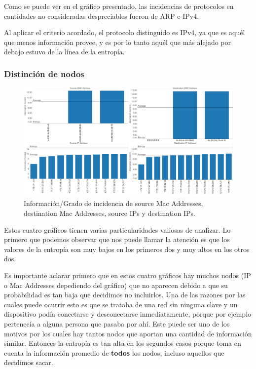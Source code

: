 \documentclass{article}
\theoremstyle{definition}
\theoremstyle{remark}
\begin{document}
Como se puede ver en el gráfico presentado, las incidencias de protocolos en cantidades no consideradas despreciables fueron de ARP e IPv4. 

Al aplicar el criterio acordado, el protocolo distinguido es IPv4, ya que es aquél que menos información provee, y es por lo tanto aquél que más alejado por debajo estuvo de la línea de la entropía.

\subsubsection{Distinción de nodos}
\begin{figure}[H]
\centering
\includegraphics[width=450pt]{captures/McDonalds/20min/PDFs Dashboard.png}
\caption{Información/Grado de incidencia de source Mac Addresses, destination Mac Addresses, source IPs y destination IPs.}
\end{figure}

Estos cuatro gráficos tienen varias particularidades valiosas de analizar. Lo primero que podemos observar que nos puede llamar la atención es que los valores de la entropía son muy bajos en los primeros dos y muy altos en los otros dos. 

Es importante aclarar primero que en estos cuatro gráficos hay muchos nodos (IP o Mac Addresses depediendo del gráfico) que no aparecen debido a que su probabilidad es tan baja que decidimos no incluirlos. Una de las razones por las cuales puede ocurrir esto es que se trataba de una red sin ninguna clave y un dispositivo podía conectarse y desconectarse inmediatamente, porque por ejemplo pertenecía a alguna persona que pasaba por ahí. Este puede ser uno de los motivos por los cuales hay tantos nodos que aportan una cantidad de información similar. Entonces la entropía es tan alta en los segundos casos porque toma en cuenta la información promedio de \textbf{todos} los nodos, incluso aquellos que decidimos sacar. 
\end{document}
